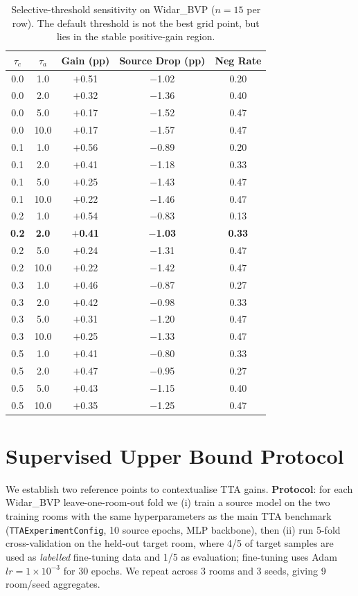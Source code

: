 \begin{table}[h]
\centering
\small
\begin{tabular}{ccccc}
\toprule
$\tau_c$ & $\tau_a$ & \textbf{Gain (pp)} & \textbf{Source Drop (pp)} & \textbf{Neg Rate} \\
\midrule
0.0 & 1.0 & $+$0.51 & $-$1.02 & 0.20 \\
0.0 & 2.0 & $+$0.32 & $-$1.36 & 0.40 \\
0.0 & 5.0 & $+$0.17 & $-$1.52 & 0.47 \\
0.0 & 10.0 & $+$0.17 & $-$1.57 & 0.47 \\
0.1 & 1.0 & $+$0.56 & $-$0.89 & 0.20 \\
0.1 & 2.0 & $+$0.41 & $-$1.18 & 0.33 \\
0.1 & 5.0 & $+$0.25 & $-$1.43 & 0.47 \\
0.1 & 10.0 & $+$0.22 & $-$1.46 & 0.47 \\
0.2 & 1.0 & $+$0.54 & $-$0.83 & 0.13 \\
\textbf{0.2} & \textbf{2.0} & \textbf{$+$0.41} & \textbf{$-$1.03} & \textbf{0.33} \\
0.2 & 5.0 & $+$0.24 & $-$1.31 & 0.47 \\
0.2 & 10.0 & $+$0.22 & $-$1.42 & 0.47 \\
0.3 & 1.0 & $+$0.46 & $-$0.87 & 0.27 \\
0.3 & 2.0 & $+$0.42 & $-$0.98 & 0.33 \\
0.3 & 5.0 & $+$0.31 & $-$1.20 & 0.47 \\
0.3 & 10.0 & $+$0.25 & $-$1.33 & 0.47 \\
0.5 & 1.0 & $+$0.41 & $-$0.80 & 0.33 \\
0.5 & 2.0 & $+$0.47 & $-$0.95 & 0.27 \\
0.5 & 5.0 & $+$0.43 & $-$1.15 & 0.40 \\
0.5 & 10.0 & $+$0.35 & $-$1.25 & 0.47 \\
\bottomrule
\end{tabular}
\caption{Selective-threshold sensitivity on Widar\_BVP ($n=15$ per row). The default threshold is not the best grid point, but lies in the stable positive-gain region.}
\label{tab:threshold_sensitivity}
\end{table}

\section{Supervised Upper Bound Protocol}
\label{app:upperbound}

We establish two reference points to contextualise TTA gains. \textbf{Protocol}: for each Widar\_BVP leave-one-room-out fold we (i) train a source model on the two training rooms with the same hyperparameters as the main TTA benchmark (\texttt{TTAExperimentConfig}, 10 source epochs, MLP backbone), then (ii) run 5-fold cross-validation on the held-out target room, where 4/5 of target samples are used as \emph{labelled} fine-tuning data and 1/5 as evaluation; fine-tuning uses Adam $lr{=}1\times10^{-3}$ for 30 epochs. We repeat across 3 rooms and 3 seeds, giving 9 room/seed aggregates.

